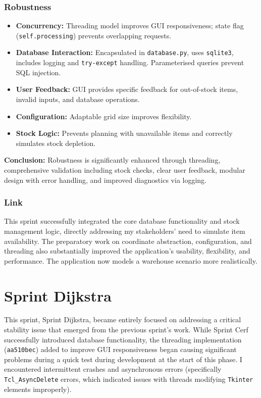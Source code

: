 \subsubsection{Robustness}
	\begin{itemize}
		\item \textbf{Concurrency:} Threading model improves GUI responsiveness; state flag (\verb|self.processing|) prevents overlapping requests.
		\item \textbf{Database Interaction:} Encapsulated in \verb|database.py|, uses \verb|sqlite3|, includes logging and \verb|try-except| handling. Parameterised queries prevent SQL injection.
		\item \textbf{User Feedback:} GUI provides specific feedback for out-of-stock items, invalid inputs, and database operations.
		\item \textbf{Configuration:} Adaptable grid size improves flexibility.
		\item \textbf{Stock Logic:} Prevents planning with unavailable items and correctly simulates stock depletion.
	\end{itemize}
	\textbf{Conclusion:} Robustness is significantly enhanced through threading, comprehensive validation including stock checks, clear user feedback, modular design with error handling, and improved diagnostics via logging.
		
\subsubsection{Link}
This sprint successfully integrated the core database functionality and stock management logic, directly addressing my stakeholders' need to simulate item availability. The preparatory work on coordinate abstraction, configuration, and threading also substantially improved the application's usability, flexibility, and performance. The application now models a warehouse scenario more realistically.

\newpage

\section{Sprint Dijkstra}

This sprint, Sprint Dijkstra, became entirely focused on addressing a critical stability issue that emerged from the previous sprint's work. While Sprint Cerf successfully introduced database functionality, the threading implementation (\verb|aa510bec|) added to improve GUI responsiveness began causing significant problems during a quick test during development at the start of this phase. I encountered intermittent crashes and asynchronous errors (specifically \verb|Tcl_AsyncDelete| errors, which indicated issues with threads modifying \verb|Tkinter| elements improperly).

